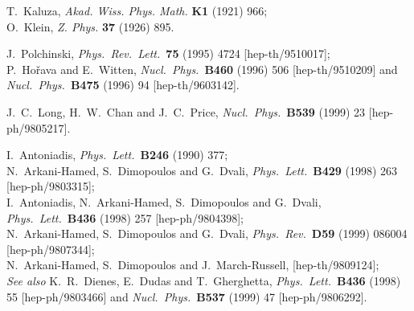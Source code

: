 \documentclass[a4paper,12pt]{article}
\begin{document}
\begin{thebibliography}{99}

\small

T.~Kaluza, {\it Akad. Wiss. Phys. Math.} {\bf K1} (1921) 966;\\
O.~Klein, {\it Z. Phys.} {\bf 37} (1926) 895.

J.~Polchinski,
{\it Phys.\ Rev.\ Lett.}\  {\bf 75} (1995) 4724
[hep-th/9510017];\\
P.~Ho{\v r}ava and E.~Witten,
{\it Nucl.\ Phys.}\  {\bf B460} (1996) 506
[hep-th/9510209] and
{\it Nucl.\ Phys.}\  {\bf B475} (1996) 94
[hep-th/9603142].

J.~C.~Long, H.~W.~Chan and J.~C.~Price,
{\it Nucl.\ Phys.}\  {\bf B539} (1999) 23
[hep-ph/9805217].


I.~Antoniadis,
{\it Phys.\ Lett.}\ {\bf B246} (1990) 377;\\
%
N.~Arkani-Hamed, S.~Dimopoulos and G.~Dvali,
{\it Phys.\ Lett.}\  {\bf B429} (1998) 263
[hep-ph/9803315];\\
I.~Antoniadis, N.~Arkani-Hamed, S.~Dimopoulos and G.~Dvali,
{\it Phys.\ Lett.}\ {\bf B436} (1998) 257
[hep-ph/9804398];\\
%
N.~Arkani-Hamed, S.~Dimopoulos and G.~Dvali,
{\it Phys.\ Rev.}\  {\bf D59} (1999) 086004
[hep-ph/9807344];\\
%
N.~Arkani-Hamed, S.~Dimopoulos and J.~March-Russell,
[hep-th/9809124];\\
%
{\it See also}
K.~R.~Dienes, E.~Dudas and T.~Gherghetta,
{\it Phys.\ Lett.}\  {\bf B436} (1998) 55
[hep-ph/9803466]
%
and
{\it Nucl.\ Phys.}\  {\bf B537} (1999) 47
[hep-ph/9806292].


\end{thebibliography}
\end{document}
